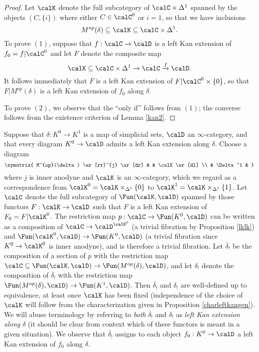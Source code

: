 \begin{proof}
Let $\calK$ denote the full subcategory of $\calC \times \Delta^{1}$ spanned by the objects
$(C, \{i\})$ where either $C \in \calC^{0}$ or $i=1$, so that we have inclusions
$$ M^{op}(\delta) \subseteq \calK \subseteq \calC \times \Delta^{1}.$$
To prove $(1)$, suppose that $f: \calC \rightarrow \calD$ is a left Kan extension of 
$f_0 = f | \calC^{0}$ and let $F$ denote the composite map
$$ \calK \subseteq \calC \times \Delta^{1} \rightarrow \calC \stackrel{f}{\rightarrow} \calD.$$
It follows immediately that $F$ is a left Kan extension of $F | \calC^{0} \times \{0\}$, so that
$F| M^{op}(\delta)$ is a left Kan extension of $f_0$ along $\delta$.

To prove $(2)$, we observe that the ``only if'' follows from $(1)$; the converse follows from the existence criterion of Lemma \ref{kan2}.
\end{proof}

Suppose that $\delta: K^{0} \rightarrow K^{1}$ is a map of simplicial sets, $\calD$ an $\infty$-category, and that every diagram $K^{0} \rightarrow \calD$ admits a left Kan extension along $\delta$. Choose a diagram
$$\xymatrix{ M^{op}(\delta) \ar[rr]^{j} \ar[dr] & & \calK \ar[dl] \\
& \Delta^1 & }$$
where $j$ is inner anodyne and $\calK$ is an $\infty$-category, which we regard
as a correspondence from $\calK^{0} = \calK \times_{\Delta^1} \{0\}$ to 
$\calK^{1} = \calK \times_{ \Delta^1} \{1\}$. Let $\calC$ denote the full subcategory
of $\Fun(\calK, \calD)$ spanned by those functors $F: \calK \rightarrow \calD$ such that
$F$ is a left Kan extension of $F_0 = F|\calK^{0}$. The restriction map
$p: \calC \rightarrow \Fun(K^0, \calD)$ can be written as a composition of
$\calC \rightarrow \calD^{\calK^0}$ (a trivial fibration by Proposition \ref{lklk}) and
$\Fun(\calK^{0},\calD) \rightarrow \Fun(K^0,\calD)$ (a trivial fibration since $K^0 \rightarrow \calK^0$ is inner anodyne), and is therefore a trivial fibration. Let $\overline{\delta}_{!}$ be the composition of
a section of $p$ with the restriction map $\calC \subseteq \Fun(\calK, \calD) \rightarrow \Fun( M^{op}(\delta), \calD)$, and let $\delta_{!}$ denote the composition of 
$\overline{\delta}_{!}$ with the restriction map $\Fun( M^{op}(\delta),\calD) \rightarrow 
\Fun(K^1,\calD)$. Then $\overline{\delta}_{!}$ and $\delta_{!}$ are well-defined up to equivalence, at least once $\calK$ has been fixed (independence of the choice of $\calK$ will follow from the characterization given in Proposition \ref{charleftkangen}). We will abuse terminology by referring to {\em both} $\overline{\delta}_{!}$ and $\delta_{!}$ as {\it left Kan extension along $\delta$} (it should be clear from context which of these functors is meant in a given situation). We observe that $\overline{\delta}_{!}$ assigns to each object $f_0: K^0 \rightarrow \calD$ a 
left Kan extension of $f_0$ along $\delta$. 

